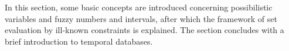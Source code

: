 In this section, some basic concepts are introduced concerning possibilistic variables and fuzzy numbers and intervals, after which the framework of set evaluation by ill-known constraints\cite{Pon11} is explained. The section concludes with a brief introduction to temporal databases.





